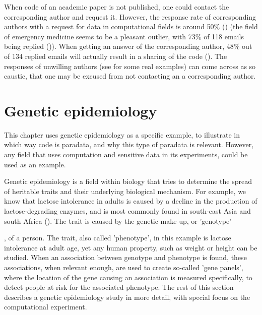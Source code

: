When code of an academic paper is not published, 
one could contact the corresponding author and request it.
However, the response rate of corresponding authors 
with a request for data in computational fields is around 50\% 
(\cite{manca2018non, stodden2018empirical, teunis2015corresponding}) 
(the field of emergency medicine seems to be a pleasant outlier, 
with 73\% of 118 emails being replied (\cite{o2003email})).
When getting an answer of the corresponding author, 
48\% out of 134 replied emails will actually result 
in a sharing of the code (\cite{stodden2018empirical}).
The responses of unwilling authors (see \cite{stodden2018empirical} for 
some real examples) can come across as so caustic, 
that one may be excused from not contacting an a corresponding author.

\section{Genetic epidemiology}


This chapter uses genetic epidemiology as a specific example,
to illustrate in which way code is paradata,
and why this type of paradata is relevant.
However, any field that uses computation 
and sensitive data in its experiments,
could be used as an example.


Genetic epidemiology is a field within biology that
tries to determine the spread of heritable traits 
and their underlying biological mechanism.
For example, we know that lactose intolerance in adults is
caused by a decline in the production of lactose-degrading enzymes,
and is most commonly found in south-east Asia and south 
Africa (\cite{storhaug2017country}).
The trait is caused by the genetic make-up, or 'genotype'

, of a person.
The trait, also called 'phenotype', 
in this example is lactose intolerance at adult age,
yet any human property, such as weight or height can be studied.
When an association between genotype and phenotype is found,
these associations, when relevant enough, are used to 
create so-called 'gene panels', 
where the location of the gene causing 
an association is measured specifically, 
to detect people at risk for the associated phenotype.
The rest of this section describes a genetic epidemiology study 
in more detail, with special focus on the computational experiment.


